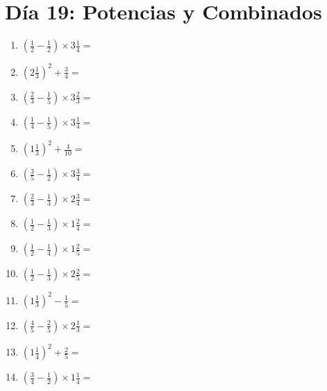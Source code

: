 \documentclass[12pt]{article}
\begin{document}
\section*{Día 19: Potencias y Combinados}
\begin{enumerate}
\item \large $ \left( \frac{1}{2} - \frac{1}{2} \right) \times 3 \frac{1}{4} = $ \vspace{1.6cm}
\item \large $ \left( 2 \frac{1}{3} \right)^2 + \frac{3}{4} = $ \vspace{1.6cm}
\item \large $ \left( \frac{2}{3} - \frac{1}{5} \right) \times 3 \frac{2}{3} = $ \vspace{1.6cm}
\item \large $ \left( \frac{1}{4} - \frac{1}{5} \right) \times 3 \frac{1}{4} = $ \vspace{1.6cm}
\item \large $ \left( 1 \frac{1}{3} \right)^2 + \frac{4}{10} = $ \vspace{1.6cm}
\item \large $ \left( \frac{3}{5} - \frac{1}{2} \right) \times 3 \frac{3}{4} = $ \vspace{1.6cm}
\item \large $ \left( \frac{2}{3} - \frac{1}{3} \right) \times 2 \frac{3}{4} = $ \vspace{1.6cm}
\item \large $ \left( \frac{1}{2} - \frac{1}{3} \right) \times 1 \frac{2}{4} = $ \vspace{1.6cm}
\item \large $ \left( \frac{1}{2} - \frac{1}{4} \right) \times 1 \frac{2}{5} = $ \vspace{1.6cm}
\item \large $ \left( \frac{1}{2} - \frac{1}{3} \right) \times 2 \frac{2}{5} = $ \vspace{1.6cm}
\newpage
\item \large $ \left( 1 \frac{1}{3} \right)^2 - \frac{1}{5} = $ \vspace{1.6cm}
\item \large $ \left( \frac{4}{5} - \frac{2}{5} \right) \times 2 \frac{1}{3} = $ \vspace{1.6cm}
\item \large $ \left( 1 \frac{1}{4} \right)^2 + \frac{2}{5} = $ \vspace{1.6cm}
\item \large $ \left( \frac{3}{4} - \frac{1}{2} \right) \times 1 \frac{1}{4} = $ \vspace{1.6cm}

\end{enumerate}
\end{document}
